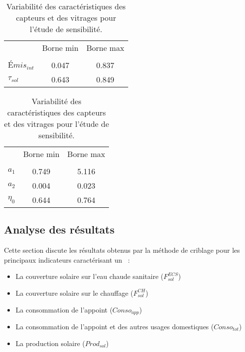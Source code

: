 \begin{table}
\centering
\caption{Variabilité des caractéristiques des capteurs et des vitrages pour l’étude
         de sensibilité.}
\label{tab:variabilite_capteur_vitrage}
\begin{minipage}[t][][b]{0.45\linewidth}
\begin{tabular}{l c c}
  \toprule
  \addlinespace
                                               & Borne min     & Borne max    \\
  \addlinespace[\defaultaddspace]
  \multicolumn{2}{l}{\textbf{Vitrages}}                                       \\
  \midrule
  $Émis_{int}$                                 & \num{0.047}   & \num{0.837}  \\
  $\tau_{sol}$                                 & \num{0.643}   & \num{0.849}  \\
  \bottomrule
  \end{tabular}
\end{minipage}%
\begin{minipage}[t][][b]{0.45\linewidth}
\begin{tabular}{l c c}
  \toprule
  \addlinespace
                                               & Borne min     & Borne max    \\
  \addlinespace[\defaultaddspace]
  \multicolumn{3}{l}{\textbf{Capteurs solaires}}                              \\
  \midrule
  $a_{1}$                                      & \num{0.749}   &  \num{5.116} \\
  $a_{2}$                                      & \num{0.004}   &  \num{0.023} \\
  $\eta_{0}$                                   & \num{0.644}   &  \num{0.764} \\
  \bottomrule
  \end{tabular}
\end{minipage}
\end{table}



\subsection{Analyse des résultats} %
\label{sub:analyse_des_resultats_morris}
Cette section discute les résultats obtenus par la méthode de criblage pour
les principaux indicateurs caractérisant un ~:
\begin{itemize}
  \item La couverture solaire sur l’eau chaude sanitaire ($F_{sol}^{ECS}$)
  \item La couverture solaire sur le chauffage ($F_{sol}^{CH}$)
  \item La consommation de l’appoint ($Conso_{app}$)
  \item La consommation de l’appoint et des autres usages domestiques ($Conso_{tot}$)
  \item La production solaire ($Prod_{sol}$)
\end{itemize}

